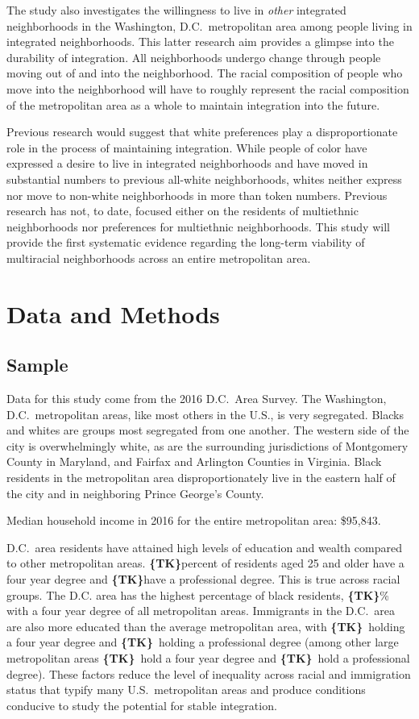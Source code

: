 \documentclass[11pt]{baderart}
\newcommand{\TK}{\textbf{\{TK\}}}
\begin{document}
The study also investigates the willingness to live in \emph{other} integrated neighborhoods in the Washington, D.C.\ metropolitan area among people living in integrated neighborhoods. This latter research aim provides a glimpse into the durability of integration. All neighborhoods undergo change through people moving out of and into the neighborhood. The racial composition of people who move into the neighborhood will have to roughly represent the racial composition of the metropolitan area as a whole to maintain integration into the future. 

Previous research would suggest that white preferences play a disproportionate role in the process of maintaining integration. While people of color have expressed a desire to live in integrated neighborhoods and have moved in substantial numbers to previous all-white neighborhoods, whites neither express nor move to non-white neighborhoods in more than token numbers. Previous research has not, to date, focused either on the residents of multiethnic neighborhoods nor preferences for multiethnic neighborhoods. This study will provide the first systematic evidence regarding the long-term viability of multiracial neighborhoods across an entire metropolitan area. 

\section{Data and Methods}
\subsection{Sample}
Data for this study come from the 2016 D.C.\ Area Survey. The Washington, D.C.\ metropolitan areas, like most others in the U.S., is very segregated. Blacks and whites are groups most segregated from one another. The western side of the city is overwhelmingly white, as are the surrounding jurisdictions of Montgomery County in Maryland, and Fairfax and Arlington Counties in Virginia. Black residents in the metropolitan area disproportionately live in the eastern half of the city and in neighboring Prince George's County. 

Median household income in 2016 for the entire metropolitan area: \$95,843.

D.C.\ area residents have attained high levels of education and wealth compared to other metropolitan areas. \TK percent of residents aged 25 and older have a four year degree and \TK have a professional degree. This is true across racial groups. The D.C. area has the highest percentage of black residents, \TK\% with a four year degree of all metropolitan areas. Immigrants in the D.C.\ area are also more educated than the average metropolitan area, with \TK\ holding a four year degree and \TK\ holding a professional degree (among other large metropolitan areas \TK\ hold a four year degree and \TK\ hold a professional degree). These factors reduce the level of inequality across racial and immigration status that typify many U.S.\ metropolitan areas and produce conditions conducive to study the potential for stable integration.
\end{document}
